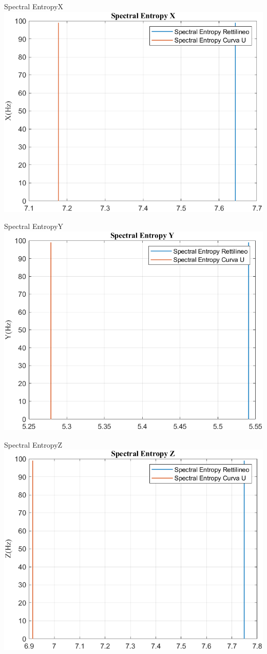 \documentclass[beamer]{standalone}
\begin{document}
	\begin{frame}{{Spectral EntropyX}}
		\centering\includegraphics[height=.8\textheight]{figure/Mag/Trasformata/Spectral EntropyX}
	\end{frame}
	
	\begin{frame}{{Spectral EntropyY}}
		\centering\includegraphics[height=.8\textheight]{figure/Mag/Trasformata/Spectral EntropyY}
	\end{frame}
	
	\begin{frame}{{Spectral EntropyZ}}
		\centering\includegraphics[height=.8\textheight]{figure/Mag/Trasformata/Spectral EntropyZ}
	\end{frame}
	
\end{document}
